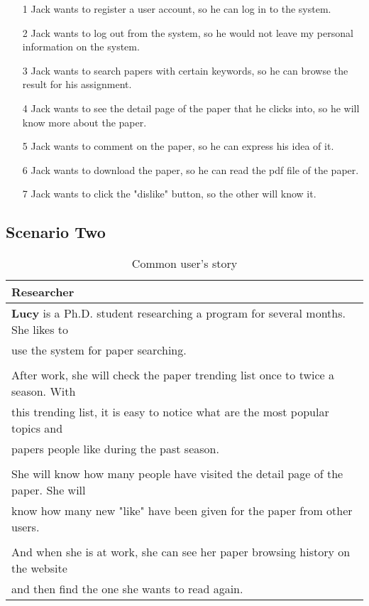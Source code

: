 \begin{itemize}
    \item [1] Jack wants to register a user account, so he can log in to the system.
    \item [2] Jack wants to log out from the system, so he would not leave my personal information on the system.
    \item [3] Jack wants to search papers with certain keywords, so he can browse the result for his assignment.
    \item [4] Jack wants to see the detail page of the paper that he clicks into, so he will know more about the paper.
    \item [5] Jack wants to comment on the paper, so he can express his idea of it.
    \item [6] Jack wants to download the paper, so he can read the pdf file of the paper.
    \item [7] Jack wants to click the "dislike" button, so the other will know it.
\end{itemize}

\subsection*{Scenario Two}

\begin{table}[!ht]
    \centering
	\begin{tabular}{ l }
		\hline
		\textbf{Researcher}                                   \\
		\hline
		\textbf{Lucy} is a Ph.D. student researching a program for several months. She likes to \\
        use the system for paper searching.       \\
		\\
		After work, she will check the paper trending list once to twice a season. With \\
        this trending list, it is easy to notice what are the most popular topics and \\
        papers people like during the past season.                                               \\
		\\
		She will know how many people have visited the detail page of the paper. She will \\
        know how many new "like" have been given for the paper from other users.                          \\
		\\
		And when she is at work, she can see her paper browsing history on the website \\
        and then find the one she wants to read again.                                                    \\
		\hline
	\end{tabular}
	\caption{Common user's story}
	\label{table:us2}
\end{table}

